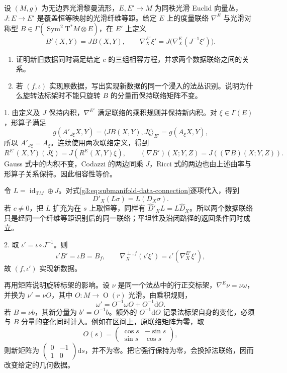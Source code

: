 \begin{exercise}\label{g3:ex:normal-data-gauge-equivalence}
	设 \((M,g)\) 为无边界光滑黎曼流形，\(E,E'\to M\) 为同秩光滑 Euclid 向量丛，\(J:E\to E'\) 是覆盖恒等映射的光滑纤维等距。给定 \(E\) 上的度量联络 \(\nabla^E\) 与光滑对称型 \(B\in\Gamma(\operatorname{Sym}^2\mathrm T^*M\otimes E)\)，在 \(E'\) 上定义
	\[
		B'(X,Y)=J B(X,Y),\qquad
		\nabla^{E'}_X\xi'=J\bigl(\nabla^E_X(J^{-1}\xi')\bigr).
	\]
	\begin{enumerate}
		\item 证明新旧数据同时满足给定 \(c\) 的三组相容方程，并求两个数据联络之间的关系。
		\item 若 \((f,\iota)\) 实现原数据，写出实现新数据的同一个浸入的法丛识别。说明为什么旋转法标架时不能只旋转 \(B\) 的分量而保持联络矩阵不变。
	\end{enumerate}
\end{exercise}
\begin{solution}
	1. 由定义及 \(J\) 保持内积，\(\nabla^{E'}\) 满足联络的乘积规则并保持新内积。对 \(\xi\in\Gamma(E)\)，形算子满足
	\[
		g(A'_{J\xi}X,Y)
		=\langle JB(X,Y),J\xi\rangle_{E'}
		=g(A_\xi X,Y),
	\]
	所以 \(A'_{J\xi}=A_\xi\)。连续使用两次联络定义，得到
	\[
		R^{E'}(X,Y)(J\xi)=J(R^E(X,Y)\xi),
		\qquad(\nabla B')(X;Y,Z)=J((\nabla B)(X;Y,Z)).
	\]
	Gauss 式中的内积不变，Codazzi 的两边同乘 \(J\)，Ricci 式的两边也由上述曲率与形算子关系保持。因此相容性等价。

	令 \(L=\operatorname{id}_{\mathrm TM}\oplus J\)。对式\eqref{g3:eq:submanifold-data-connection}逐项代入，得到
	\[
		D'_X(L\sigma)=L(D_X\sigma).
	\]
	若 \(c\ne0\)，把 \(L\) 扩充为在 \(s\) 上取恒等，同样有 \(\widehat D'_XL=L\widehat D_X\)。所以两个数据联络只是经同一个纤维等距识别后的同一联络；平坦性及沿闭路径的返回条件同时成立。

	2. 取 \(\iota'=\iota\circ J^{-1}\)。则
	\[
		\iota'B'=\iota B=B_f,
		\qquad
		\nabla^{\perp,f}_X(\iota'\xi')
		=\iota'(\nabla^{E'}_X\xi'),
	\]
	故 \((f,\iota')\) 实现新数据。

	再用矩阵说明旋转标架的影响。设 \(\nu\) 是同一个法丛中的行正交标架，\(\nabla^E\nu=\nu\omega\)，并换为 \(\nu'=\nu O\)，其中 \(O:M\to\operatorname O(r)\) 光滑。由乘积规则，
	\[
		\omega'=O^{-1}\omega O+O^{-1}\mathrm dO.
	\]
	若 \(B=\nu b\)，其新分量为 \(b'=O^{-1}b\)。额外的 \(O^{-1}\mathrm dO\) 记录法标架自身的变化，必须与 \(B\) 分量的变化同时计入。例如在区间上，原联络矩阵为零，取
	\[
		O(s)=\begin{pmatrix}\cos s&-\sin s\\ \sin s&\cos s\end{pmatrix},
	\]
	则新矩阵为 \(\left(\begin{smallmatrix}0&-1\\1&0\end{smallmatrix}\right)\mathrm ds\)，并不为零。把它强行保持为零，会换掉法联络，因而改变给定的几何数据。
\end{solution}

